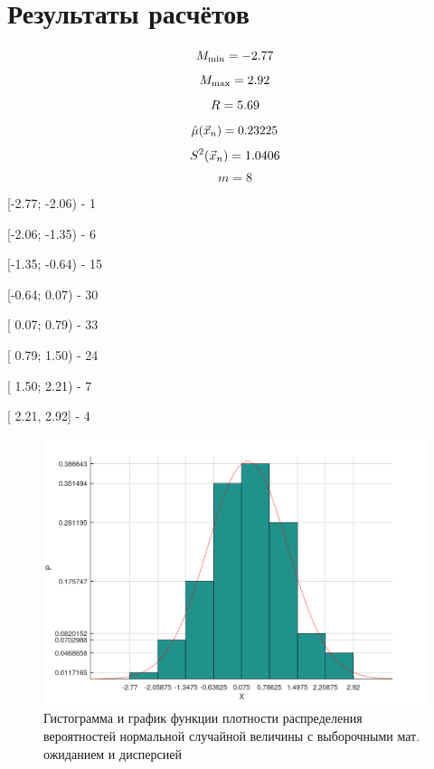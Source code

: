 \documentclass[12pt]{report}
\begin{document}
\section{Результаты расчётов}

\begin{equation*}
M_{\min} = -2.77 \\
\end{equation*}
\begin{equation*}
M_{\max} = 2.92 \\
\end{equation*}
\begin{equation*}
    R = 5.69 \\
\end{equation*}
\begin{equation*}
    \hat\mu(\vec x_n) = 0.23225 \\
\end{equation*}
\begin{equation*}
    S^2(\vec x_n) = 1.0406 \\
\end{equation*}
\begin{equation*}
    m = 8
\end{equation*}

[-2.77; -2.06) -        1


[-2.06; -1.35) -        6

[-1.35; -0.64) -       15

[-0.64;  0.07) -       30

[ 0.07;  0.79) -       33

[ 0.79;  1.50) -       24

[ 1.50;  2.21) -        7


[ 2.21,  2.92] -        4

\newpage
\begin{figure}[H]
	\begin{center}
		\includegraphics[scale=0.6]{./inc/img/f1.png}
			\caption{Гистограмма и график функции плотности распределения вероятностей нормальной случайной величины с выборочными мат. ожиданием и дисперсией}
	\end{center}
	\label{img:eval}
\end{figure}
\end{document}
